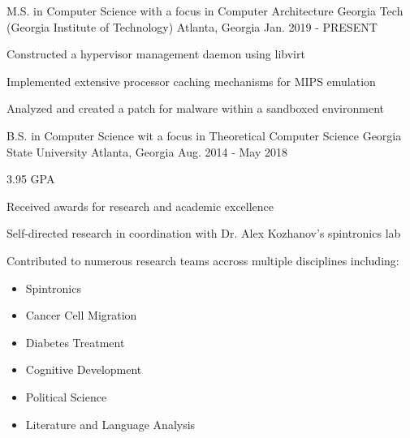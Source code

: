 


\begin{cventries}


\cventry
{M.S. in Computer Science with a focus in Computer Architecture} %
{Georgia Tech (Georgia Institute of Technology)} %
{Atlanta, Georgia} %
{Jan. 2019 - PRESENT} %
{ %
\begin{cvitems}
\item {Constructed a hypervisor management daemon using libvirt}
\item {Implemented extensive processor caching mechanisms for MIPS emulation}
\item {Analyzed and created a patch for malware within a sandboxed environment}
\end{cvitems}
}

\cventry
{B.S. in Computer Science wit a focus in Theoretical Computer Science} %
{Georgia State University} %
{Atlanta, Georgia} %
{Aug. 2014 - May 2018} %
{ %
\begin{cvitems}
\item{3.95 GPA}
\item{Received awards for research and academic excellence}
\item{Self-directed research in coordination with Dr. Alex Kozhanov's spintronics lab}
\item{Contributed to numerous research teams accross multiple disciplines including:}
\begin{itemize}
\item{Spintronics}
\item{Cancer Cell Migration}
\item{Diabetes Treatment}
\item{Cognitive Development}
\item{Political Science}
\item{Literature and Language Analysis}
\end{itemize}
\end{cvitems}
}


\end{cventries}
